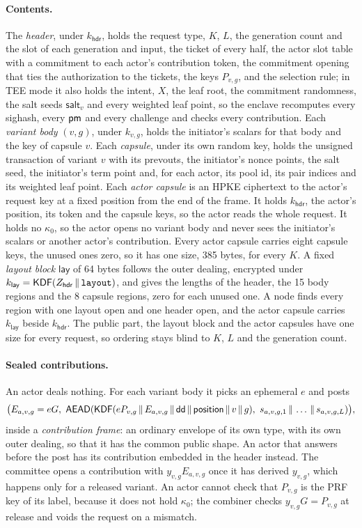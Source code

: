 \paragraph{Contents.} The \emph{header}, under $k_{\mathsf{hdr}}$, holds the request type, $K$, $L$, the generation count and the slot of each generation and input, the ticket of every half, the actor slot table with a commitment to each actor's contribution token, the commitment opening that ties the authorization to the tickets, the keys $P_{v,g}$, and the selection rule; in TEE mode it also holds the intent, $X$, the leaf root, the commitment randomness, the salt seeds $\mathsf{salt}_v$ and every weighted leaf point, so the enclave recomputes every sighash, every $\mathsf{pm}$ and every challenge and checks every contribution. Each \emph{variant body} $(v, g)$, under $k_{v,g}$, holds the initiator's scalars for that body and the key of capsule $v$. Each \emph{capsule}, under its own random key, holds the unsigned transaction of variant $v$ with its prevouts, the initiator's nonce points, the salt seed, the initiator's term point and, for each actor, its pool id, its pair indices and its weighted leaf point. Each \emph{actor capsule} is an HPKE ciphertext to the actor's request key at a fixed position from the end of the frame. It holds $k_{\mathsf{hdr}}$, the actor's position, its token and the capsule keys, so the actor reads the whole request. It holds no $\kappa_0$, so the actor opens no variant body and never sees the initiator's scalars or another actor's contribution. Every actor capsule carries eight capsule keys, the unused ones zero, so it has one size, 385 bytes, for every $K$. A fixed \emph{layout block} $\mathsf{lay}$ of 64 bytes follows the outer dealing, encrypted under $k_{\mathsf{lay}} = \mathsf{KDF}(Z_{\mathsf{hdr}} \,\|\, \texttt{layout})$, and gives the lengths of the header, the 15 body regions and the 8 capsule regions, zero for each unused one. A node finds every region with one layout open and one header open, and the actor capsule carries $k_{\mathsf{lay}}$ beside $k_{\mathsf{hdr}}$. The public part, the layout block and the actor capsules have one size for every request, so ordering stays blind to $K$, $L$ and the generation count.

\paragraph{Sealed contributions.} An actor deals nothing. For each variant body it picks an ephemeral $e$ and posts
\[
  \bigl(E_{a,v,g} = eG,\ \mathsf{AEAD}(\KDF(e P_{v,g} \,\|\, E_{a,v,g} \,\|\, \dd \,\|\, \mathsf{position} \,\|\, v \,\|\, g),\ s_{a,v,g,1} \,\|\, \dots \,\|\, s_{a,v,g,L})\bigr),
\]
inside a \emph{contribution frame}: an ordinary envelope of its own type, with its own outer dealing, so that it has the common public shape. An actor that answers before the post has its contribution embedded in the header instead. The committee opens a contribution with $y_{v,g} E_{a,v,g}$ once it has derived $y_{v,g}$, which happens only for a released variant. An actor cannot check that $P_{v,g}$ is the PRF key of its label, because it does not hold $\kappa_0$; the combiner checks $y_{v,g} G = P_{v,g}$ at release and voids the request on a mismatch.

